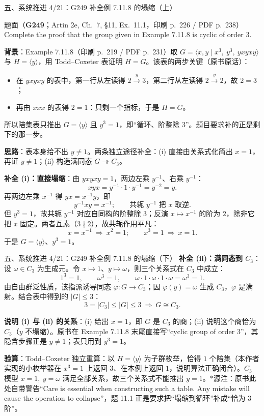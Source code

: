 \documentclass[aspectratio=169,10pt,fontset=none]{ctexbeamer}
\newcommand{\ex}[1]{\textcolor{accent}{\footnotesize\bfseries #1}}
\newcommand{\key}[1]{\textcolor{ink}{\bfseries #1}}
\newcommand{\starpt}{\textcolor{accent}{\bfseries$\ast$}}
\begin{document}
\begin{frame}[t]{五、系统推进 4/21：G249 补全例 7.11.8 的塌缩（上）}
\label{ex:G249}
\scriptsize
\begin{block}{\footnotesize 题面（\ex{G249}；Artin 2e, Ch.~7, §11, Ex.~11.1，印刷 p.~226 / PDF p.~238）}
Complete the proof that the group given in Example 7.11.8 is cyclic of order 3.
\end{block}
\key{背景}：Example 7.11.8（印刷 p.~219 / PDF p.~231）取 $G=\langle x,y\mid x^3,\ y^3,\ yxyxy\rangle$ 与 $H=\langle y\rangle$，用 Todd--Coxeter 表证明 $H=G$。该表的两步关键（原书原话）：
\begin{itemize}
\item 在 $yxyxy$ 的表中，第一行从左读得 $2\xrightarrow{y}3$，第二行从左读得 $2\xrightarrow{y}2$，故 $2=3$；
\item 再由 $xxx$ 的表得 $2=1$：只剩一个指标，于是 $H=G$。
\end{itemize}
所以陪集表只推出 $G=\langle y\rangle$ 且 $y^3=1$，即“循环、阶整除 $3$”。题目要求补的正是剩下的那一步。

\key{思路}：表本身给不出 $y\neq1$。两条独立途径补全：(i) 直接由关系式化简出 $x=1$，再证 $y\neq1$；(ii) 构造满同态 $G\twoheadrightarrow C_3$。

\key{补全 (i)：直接塌缩}：由 $yxyxy=1$，两边左乘 $y^{-1}$、右乘 $y^{-1}$：
\[ xyx=y^{-1}\cdot1\cdot y^{-1}=y^{-2}=y. \]
再两边左乘 $x^{-1}$ 得 $yx=x^{-1}y$，即
\[ y^{-1}xy=x^{-1};\qquad\text{共轭 }y^{-1}\text{ 把 }x\text{ 取逆}. \]
但 $y^3=1$，故共轭 $y^{-1}$ 对应自同构的阶整除 $3$；反演 $x\mapsto x^{-1}$ 的阶为 $2$，除非它把 $x$ 固定。两者互素（$3\nmid2$），故共轭作用平凡：
\[ x=x^{-1}\ \Longrightarrow\ x^2=1;\qquad x^3=1\ \Longrightarrow\ x=1. \]
于是 $G=\langle y\rangle$、$y^3=1$。
\end{frame}

\begin{frame}[t]{五、系统推进 4/21：G249 补全例 7.11.8 的塌缩（下）}
\scriptsize
\key{补全 (ii)：满同态到 $C_3$}：设 $\omega\in C_3$ 为生成元。令 $x\mapsto1$、$y\mapsto\omega$，则三个关系式在 $C_3$ 中成立：
\[ 1^3=1,\qquad \omega^3=1,\qquad \omega\cdot1\cdot\omega\cdot1\cdot\omega=\omega^3=1. \]
由自由群泛性质，该指派诱导同态 $\varphi:G\to C_3$；因 $\varphi(y)=\omega$ 生成 $C_3$，$\varphi$ 是满射。结合表中得到的 $|G|\le3$：
\[ 3=|C_3|\le|G|\le3\ \Longrightarrow\ G\cong C_3. \]

\key{说明 (i) 与 (ii) 的关系}：(i) 给出 $x=1$，即 $G$ 是 $C_3$ 的商；(ii) 说明这个商恰为 $C_3$（$y$ 不塌缩）。原书在 Example 7.11.8 末尾直接写“cyclic group of order 3”，其隐含步骤正是 $y\neq1$；表只用到 $y^3=1$。

\key{验算}：Todd--Coxeter 独立重算：以 $H=\langle y\rangle$ 为子群枚举，恰得 $1$ 个陪集（本作者实现的小枚举器在 $x^3=1$ 上返回 $3$、在本例上返回 $1$，说明算法正确闭合）。$C_3$ 模型 $x=1,\ y=\omega$ 满足全部关系，故三个关系式不能推出 $y=1$。\starpt 源注：原书此处自带警告“Care is essential when constructing such a table. Any mistake will cause the operation to collapse”，题 11.1 正是要求把“塌缩到循环”补成“恰为 3 阶”。
\end{frame}
\end{document}
